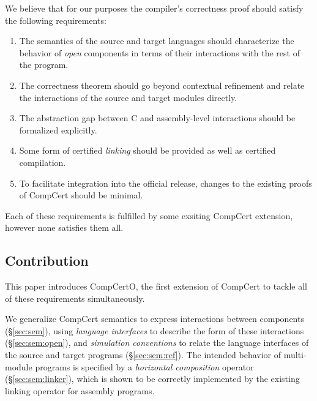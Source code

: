\documentclass[sigplan,10pt,review,anonymous]{acmart}\settopmatter{printfolios=true,printccs=false,printacmref=false}
\begin{document}
We believe that for our purposes
the compiler's correctness proof
should satisfy the following requirements:
\begin{enumerate}
\item \label{req:opensem}
  The semantics of the source and target languages
  should characterize the behavior of \emph{open} components
  in terms of their interactions with the rest of the program.
\item \label{req:opensim}
  The correctness theorem
  should go beyond contextual refinement and relate
  the interactions of the source and target modules directly.
\item \label{req:openabs}
  The abstraction gap between C and assembly-level
  interactions should be formalized explicitly.
\item \label{req:linking}
  Some form of certified \emph{linking}
  should be provided as well as certified compilation.
\item \label{req:complexity}
  To facilitate integration into the official release,
  changes to the existing proofs of CompCert
  should be minimal.
\end{enumerate}
Each of these requirements is fulfilled
by some exsiting CompCert extension,
however none satisfies them all.



\subsection{Contribution} %

This paper introduces CompCertO,
the first extension of CompCert to tackle
all of these requirements simultaneously.

We generalize CompCert semantics
to express interactions between components (\S\ref{sec:sem}),
using \emph{language interfaces}
to describe the form of these interactions (\S\ref{sec:sem:open}),
and \emph{simulation conventions}
to relate the language interfaces
of the source and target programs (\S\ref{sec:sem:ref}).
The intended behavior of
multi-module programs is specified by a
\emph{horizontal composition} operator (\S\ref{sec:sem:linker}),
which is shown to be correctly implemented
by the existing linking operator for assembly programs.
\end{document}
